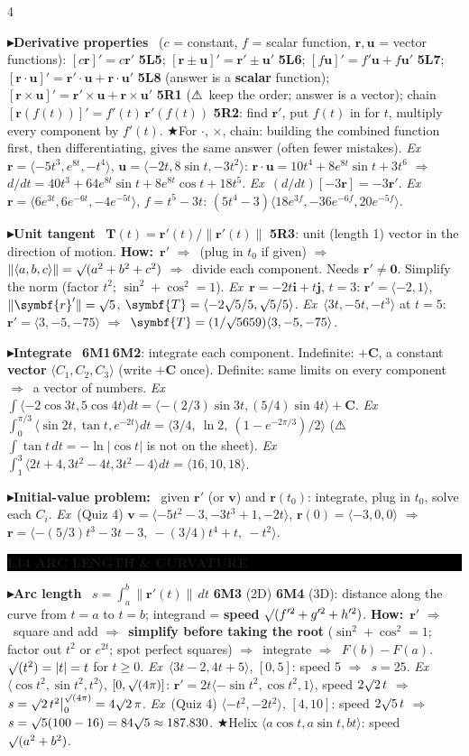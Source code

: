 \documentclass{article}
\newcommand\vb[1]{\symbf{#1}}                 %
\newcommand\nm[1]{\lVert #1\rVert}            %
\newcommand\ip[1]{\langle #1\rangle}          %
\newcommand\sh[1]{{\setlength\fboxsep{0.18pt}\colorbox{black!22}{\textbf{#1}}}} %
\newcommand\hd[1]{\par\vspace{0.5pt}\needspace{4\baselineskip}\noindent
  {\setlength\fboxsep{0.45pt}\colorbox{black}{\parbox{\dimexpr\linewidth-2\fboxsep}{\color{white}\bfseries #1}}}\par\nobreak\vspace{0.2pt}\nobreak}
\newcommand\pt[1]{\par\textbf{{\symf ▸}#1}\ }  %
\newcommand\ex{\textit{Ex}\ }                  %
\newcommand\how{\textbf{How:}\ }
\newcommand\warn{{\symf ⚠}}                    %
\newcommand\shc{{\symf ★}}                      %
\newcommand\rt{\smash{\surd}}               %
\newcommand\then{\ensuremath{\Rightarrow}}
\begin{document}
\begin{multicols*}{4}
\pt{Derivative properties} ($c$ = constant, $f$ = scalar function, $\vb r,\vb u$ = vector functions): $[c\vb r]'=c\vb r'$ \sh{5L5}; $[\vb r\pm\vb u]'=\vb r'\pm\vb u'$ \sh{5L6}; $[f\vb u]'=f'\vb u+f\vb u'$ \sh{5L7}; $[\vb r\cdot\vb u]'=\vb r'\cdot\vb u+\vb r\cdot\vb u'$ \sh{5L8} (answer is a \textbf{scalar} function); $[\vb r\times\vb u]'=\vb r'\times\vb u+\vb r\times\vb u'$ \sh{5R1} (\warn\ keep the order; answer is a vector); chain $[\vb r(f(t))]'=f'(t)\,\vb r'(f(t))$ \sh{5R2}: find $\vb r'$, put $f(t)$ in for $t$, multiply every component by $f'(t)$. \shc For $\cdot$, $\times$, chain: building the combined function first, then differentiating, gives the same answer (often fewer mistakes). \ex $\vb r=\ip{-5t^3,e^{8t},-t^4}$, $\vb u=\ip{-2t,8\sin t,-3t^2}$: $\vb r\cdot\vb u=10t^4+8e^{8t}\sin t+3t^6$ \then\ $d/dt=40t^3+64e^{8t}\sin t+8e^{8t}\cos t+18t^5$. \ex $(d/dt)[-3\vb r]=-3\vb r'$. \ex $\vb r=\ip{6e^{3t},6e^{-6t},-4e^{-5t}}$, $f=t^5-3t$: $(5t^4-3)\ip{18e^{3f},-36e^{-6f},20e^{-5f}}$.

\pt{Unit tangent} $\vb T(t)=\vb r'(t)/\nm{\vb r'(t)}$ \sh{5R3}: unit (length 1) vector in the direction of motion. \how $\vb r'$ \then\ (plug in $t_0$ if given) \then\ $\nm{\ip{a,b,c}}=\rt(a^2+b^2+c^2)$ \then\ divide each component. Needs $\vb r'\ne\vb0$. Simplify the norm (factor $t^2$; $\sin^2+\cos^2=1$). \ex $\vb r=-2t\vb i+t\vb j$, $t=3$: $\vb r'=\ip{-2,1}$, $\nm{\vb r'}=\rt5$, $\vb T=\ip{-2\rt5/5,\rt5/5}$. \ex $\ip{3t,-5t,-t^3}$ at $t=5$: $\vb r'=\ip{3,-5,-75}$ \then\ $\vb T=(1/\rt5659)\ip{3,-5,-75}$.

\pt{Integrate} \sh{6M1}\,\sh{6M2}: integrate each component. Indefinite: $+\vb C$, a constant \textbf{vector} $\ip{C_1,C_2,C_3}$ (write $+\vb C$ once). Definite: same limits on every component \then\ a vector of numbers. \ex $\int\ip{-2\cos3t,5\cos4t}dt=\ip{-(2/3)\sin3t,(5/4)\sin4t}+\vb C$. \ex $\int_0^{\pi/3}\ip{\sin2t,\tan t,e^{-2t}}dt=\ip{3/4,\ \ln2,\ (1-e^{-2\pi/3})/2}$ (\warn\ $\int\tan t\,dt=-\ln|\cos t|$ is not on the sheet). \ex $\int_1^3\ip{2t+4,3t^2-4t,3t^2-4}dt=\ip{16,10,18}$.

\pt{Initial-value problem:} given $\vb r'$ (or $\vb v$) and $\vb r(t_0)$: integrate, plug in $t_0$, solve each $C_i$. \ex (Quiz 4) $\vb v=\ip{-5t^2-3,-3t^3+1,-2t}$, $\vb r(0)=\ip{-3,0,0}$ \then\ $\vb r=\ip{-(5/3)t^3-3t-3,\ -(3/4)t^4+t,\ -t^2}$.

\hd{L14 ARC LENGTH \& CURVATURE}
\pt{Arc length} $s=\int_a^b\nm{\vb r'(t)}\,dt$ \sh{6M3} (2D) \sh{6M4} (3D): distance along the curve from $t=a$ to $t=b$; integrand = \textbf{speed} $\rt(f'^2+g'^2+h'^2)$. \how $\vb r'$ \then\ square and add \then\ \textbf{simplify before taking the root} ($\sin^2+\cos^2=1$; factor out $t^2$ or $e^{2t}$; spot perfect squares) \then\ integrate \then\ $F(b)-F(a)$. $\rt(t^2)=|t|=t$ for $t\ge0$. \ex $\ip{3t-2,4t+5}$, $[0,5]$: speed 5 \then\ $s=25$. \ex $\ip{\cos t^2,\sin t^2,t^2}$, $[0,\rt(4\pi)]$: $\vb r'=2t\ip{-\sin t^2,\cos t^2,1}$, speed $2\rt2\,t$ \then\ $s=\rt2\,t^2\big|_0^{\rt(4\pi)}=4\rt2\,\pi$. \ex (Quiz 4) $\ip{-t^2,-2t^2}$, $[4,10]$: speed $2\rt5\,t$ \then\ $s=\rt5(100-16)=84\rt5\approx187.830$. \shc Helix $\ip{a\cos t,a\sin t,bt}$: speed $\rt(a^2+b^2)$.


\end{multicols*}
\end{document}
